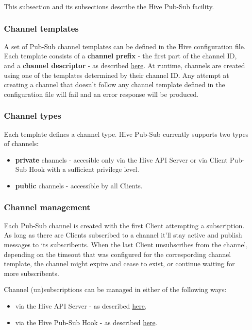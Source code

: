 \documentclass[a4paper]{article}
\begin{document}
This subsection and its subsections describe the Hive Pub-Sub facility.
\subsubsection{Channel templates}
\label{sec-7-3-1}

A set of Pub-Sub channel templates can be defined in the Hive configuration file. Each template consists of a \textbf{channel prefix} - the first part of the channel ID, and a \textbf{channel descriptor} - as described \hyperref[ref-pubsub_config]{here}. At runtime, channels are created using one of the templates determined by their channel ID. Any attempt at creating a channel that doesn't follow any channel template defined in the configuration file will fail and an error response will be produced.
\subsubsection{Channel types}
\label{sec-7-3-2}

Each template defines a channel type. Hive Pub-Sub currently supports two types of channels:


\begin{itemize}
\item \textbf{private} channels - accesible only via the Hive API Server or via Client Pub-Sub Hook with a sufficient privilege level.
\item \textbf{public} channels - accessible by all Clients.
\end{itemize}
\subsubsection{Channel management}
\label{sec-7-3-3}

Each Pub-Sub channel is created with the first Client attempting a subscription. As long as there are Clients subscribed to a channel it'll stay active and publish messages to its subscribents. When the last Client unsubscribes from the channel, depending on the timeout that was configured for the correspording channel template, the channel might expire and cease to exist, or continue waiting for more subscribents.

\noindent
Channel (un)subscriptions can be managed in either of the following ways:


\begin{itemize}
\item via the Hive API Server - as described \hyperref[sec-6-1-6]{here},
\item via the Hive Pub-Sub Hook - as described \hyperref[sec-8-2-4]{here}.
\end{itemize}
\end{document}
